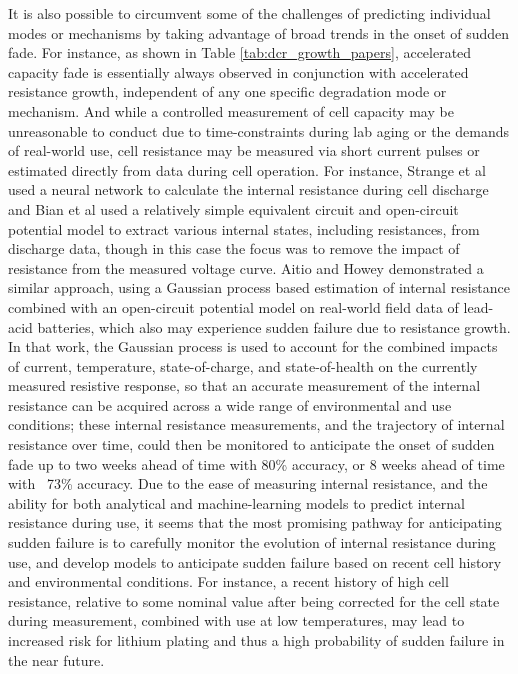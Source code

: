\documentclass[journal=jpclcd,manuscript=article]{achemso}
\begin{document}
It is also possible to circumvent some of the challenges of predicting individual modes or mechanisms by taking advantage of broad trends in the onset of sudden fade. For instance, as shown in Table \ref{tab:dcr_growth_papers}, accelerated capacity fade is essentially always observed in conjunction with accelerated resistance growth, independent of any one specific degradation mode or mechanism. And while a controlled measurement of cell capacity may be unreasonable to conduct due to time-constraints during lab aging or the demands of real-world use, cell resistance may be measured via short current pulses or estimated directly from data during cell operation. For instance, Strange et al \cite{strange_elbows_2021} used a neural network to calculate the internal resistance during cell discharge and Bian et al \cite{bian} used a relatively simple equivalent circuit and open-circuit potential model to extract various internal states, including resistances, from discharge data, though in this case the focus was to remove the impact of resistance from the measured voltage curve. Aitio and Howey \cite{aitio} demonstrated a similar approach, using a Gaussian process based estimation of internal resistance combined with an open-circuit potential model on real-world field data of lead-acid batteries, which also may experience sudden failure due to resistance growth. In that work, the Gaussian process is used to account for the combined impacts of current, temperature, state-of-charge, and state-of-health on the currently measured resistive response, so that an accurate measurement of the internal resistance can be acquired across a wide range of environmental and use conditions; these internal resistance measurements, and the trajectory of internal resistance over time, could then be monitored to anticipate the onset of sudden fade up to two weeks ahead of time with 80\% accuracy, or 8 weeks ahead of time with ~73\% accuracy. Due to the ease of measuring internal resistance, and the ability for both analytical and machine-learning models to predict internal resistance during use, it seems that the most promising pathway for anticipating sudden failure is to carefully monitor the evolution of internal resistance during use, and  develop models to anticipate sudden failure based on recent cell history and environmental conditions. For instance, a recent history of high cell resistance, relative to some nominal value after being corrected for the cell state during measurement, combined with use at low temperatures, may lead to increased risk for lithium plating and thus a high probability of sudden failure in the near future.
\end{document}
